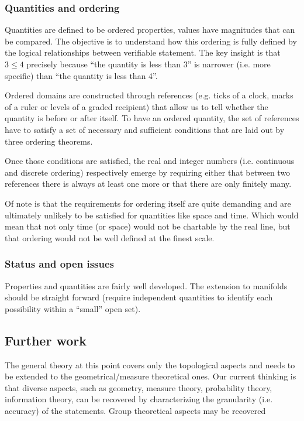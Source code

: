 \documentclass[twocolumn]{article}
\begin{document}
\subsubsection{Quantities and ordering}

Quantities are defined to be ordered properties, values have magnitudes that can be compared. The objective is to understand how this ordering is fully defined by the logical relationships between verifiable statement. The key insight is that $3 \leq 4$ precisely because ``the quantity is less than 3'' is narrower (i.e. more specific) than ``the quantity is less than 4''.

Ordered domains are constructed through references (e.g. ticks of a clock, marks of a ruler or levels of a graded recipient) that allow us to tell whether the quantity is before or after itself. To have an ordered quantity, the set of references have to satisfy a set of necessary and sufficient conditions that are laid out by three ordering theorems. 

Once those conditions are satisfied, the real and integer numbers (i.e. continuous and discrete ordering) respectively emerge by requiring either that between two references there is always at least one more or that there are only finitely many.

Of note is that the requirements for ordering itself are quite demanding and are ultimately unlikely to be satisfied for quantities like space and time. Which would mean that not only time (or space) would not be chartable by the real line, but that ordering would not be well defined at the finest scale.

\subsubsection{Status and open issues}

Properties and quantities are fairly well developed. The extension to manifolds should be straight forward (require independent quantities to identify each possibility within a ``small'' open set).

\subsection{Further work}

The general theory at this point covers only the topological aspects and needs to be extended to the geometrical/measure theoretical ones. Our current thinking is that diverse aspects, such as geometry, measure theory, probability theory, information theory, can be recovered by characterizing the granularity (i.e. accuracy) of the statements. Group theoretical aspects may be recovered 
\end{document}

